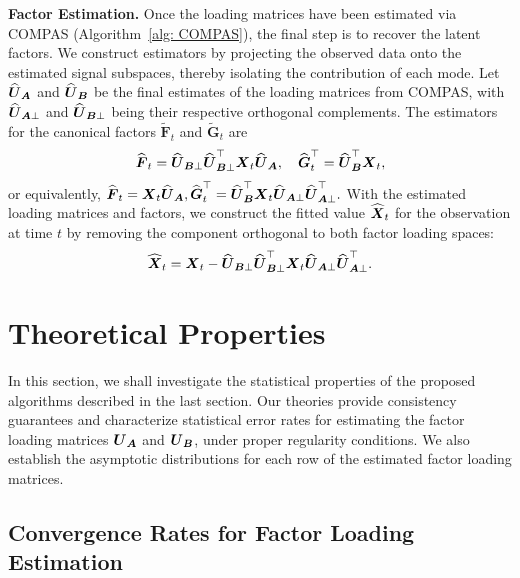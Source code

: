 \documentclass[11pt,letterpaper]{article}
\theoremstyle{definition}
\renewcommand{\hat}{\widehat}
\newcommand{\cano}[1]{\widetilde{\mathbf{#1}}}
\begin{document}
\noindent\textbf{Factor Estimation.} Once the loading matrices have been estimated via COMPAS (Algorithm~\ref{alg: COMPAS}), the final step is to recover the latent factors. We construct estimators by projecting the observed data onto the estimated signal subspaces, thereby isolating the contribution of each mode. Let $\widehat{\boldsymbol{U}}_{\boldsymbol{A}}$ and $\widehat{\boldsymbol{U}}_{\boldsymbol{B}}$ be the final estimates of the loading matrices from COMPAS, with $\widehat{\boldsymbol{U}}_{\boldsymbol{A}\perp}$ and $\widehat{\boldsymbol{U}}_{\boldsymbol{B}\perp}$ being their respective orthogonal complements. The estimators for the canonical factors $\cano F_t$ and $\cano G_t$ are
\begin{align}\label{eq:factors}
\hat \bF_t 
=  \hat \bU_{\bB\perp}\hat \bU_{\bB\perp}^\top \bX_t \hat \bU_{\bA}, \quad \hat \bG_t^\top 
= \hat \bU_{\bB}^\top \bX_t,
\end{align}
or equivalently, $\hat \bF_t = \bX_t \hat \bU_{\bA}, \hat \bG_t^\top = \hat \bU_{\bB}^\top \bX_t \hat \bU_{\bA \perp} \hat \bU_{\bA \perp}^\top.$
With the estimated loading matrices and factors, we construct the fitted value $\widehat{\boldsymbol{X}}_t$ for the observation at time $t$ by removing the component orthogonal to both factor loading spaces:
\begin{align*}
\widehat{\boldsymbol{X}}_t = \boldsymbol{X}_t - \widehat{\boldsymbol{U}}_{\boldsymbol{B}\perp}\widehat{\boldsymbol{U}}_{\boldsymbol{B}\perp}^\top \boldsymbol{X}_t \widehat{\boldsymbol{U}}_{\boldsymbol{A}\perp}\widehat{\boldsymbol{U}}_{\boldsymbol{A}\perp}^\top.    
\end{align*}








\section{Theoretical Properties}
\label{sec:theory}

In this section, we shall investigate the statistical properties of the proposed algorithms described in the last section. Our theories provide consistency guarantees and characterize statistical error rates for estimating the factor loading matrices $\boldsymbol{U}_{\boldsymbol{A}}$ and $\boldsymbol{U}_{\boldsymbol{B}}$, under proper regularity conditions. We also establish the asymptotic distributions for each row of the estimated factor loading matrices.

\subsection{Convergence Rates for Factor Loading Estimation}
\end{document}
